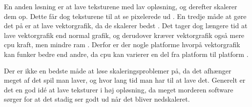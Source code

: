 \documentclass[Main.tex]{PositionOgSkalering}
\begin{document}
En anden løsning er at lave teksturene med lav opløsning, og derefter skalerer dem op. Dette får dog teksturene til at se pixelerede ud \cite{McHugh}.
En tredje måde at gøre det på er at lave vektorgrafik, da de skalerer bedst \cite{deepworldgame}. Det tager dog længere tid at lave vektorgrafik end normal grafik,\cite{deepworldgame} og derudover kræver vektorgrafik også mere cpu kraft, men mindre ram \cite{deepworldgame}. Derfor er der nogle platforme hvorpå vektorgrafik kan funker bedre end andre, da cpu kan varierer en del fra platform til platform \cite{PassMark}.

Der er ikke en bedste måde at løse skaleringsproblemer på, da det afhænger meget af det spil man laver, og hvor lang tid man har til at lave det. Generelt er det en god idé at lave teksturer i høj opløsning, da meget morderen software sørger for at det stadig ser godt ud når det bliver nedskaleret.
\end{document}
